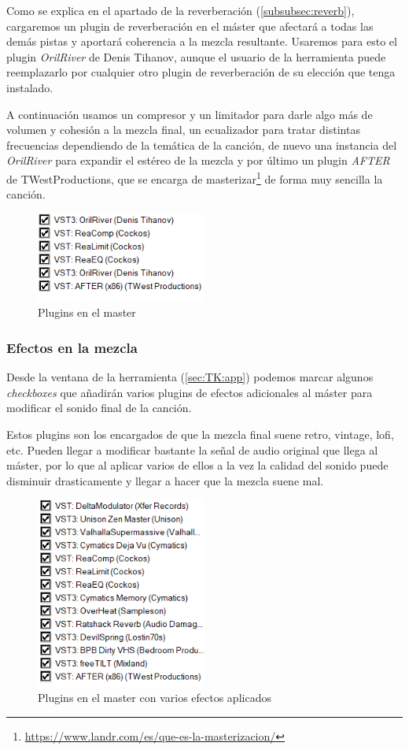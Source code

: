 Como se explica en el apartado de la reverberación (\ref{subsubsec:reverb}), cargaremos un plugin de reverberación en el máster que afectará a todas las demás pistas y aportará coherencia a la mezcla resultante. Usaremos para esto el plugin \textit{OrilRiver} de Denis Tihanov, aunque el usuario de la herramienta puede reemplazarlo por cualquier otro plugin de reverberación de su elección que tenga instalado.

A continuación usamos un compresor y un limitador para darle algo más de volumen y cohesión a la mezcla final, un ecualizador para tratar distintas frecuencias dependiendo de la temática de la canción, de nuevo una instancia del \textit{OrilRiver} para expandir el estéreo de la mezcla y por último un plugin \textit{AFTER} de TWestProductions, que se encarga de masterizar\footnote{\url{https://www.landr.com/es/que-es-la-masterizacion/}} de forma muy sencilla la canción.


\begin{figure}[h]
    \centering
    \includegraphics[width = 0.5\textwidth]{Imagenes/Bitmap/EfectosMaster.png}
    \caption{Plugins en el master}
    \label{fig:Efectos-master}
\end{figure}    

    \subsubsection{Efectos en la mezcla}
Desde la ventana de la herramienta (\ref{sec:TK:app}) podemos marcar algunos \textit{checkboxes} que añadirán varios plugins de efectos adicionales al máster para modificar el sonido final de la canción.

Estos plugins son los encargados de que la mezcla final suene retro, vintage, lofi, etc. Pueden llegar a modificar bastante la señal de audio original que llega al máster, por lo que al aplicar varios de ellos a la vez la calidad del sonido puede disminuir drasticamente y llegar a hacer que la mezcla suene mal.
    
\begin{figure}[h]
    \centering
    \includegraphics[width = 0.5\textwidth]{Imagenes/Bitmap/EfectosMasterEfectos.png}
    \caption{Plugins en el master con varios efectos aplicados}
    \label{fig:Efectos-master-efectos}
\end{figure}


